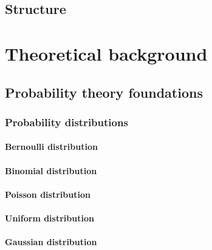 \documentclass[english,master,unicode]{ctufit-thesis}
\theoremstyle{plain}
\theoremstyle{definition}
\theoremstyle{remark}
\numberwithin{theorem}{chapter}
\begin{document}
    \section*{Structure}\label{sec:structure}
        

\chapter{Theoretical background}\label{ch:theory}
    
    \section{Probability theory foundations}\label{sec:prob-foundations}
        
        \subsection{Probability distributions}\label{sec:prob-distributions}
            
            \subsubsection{Bernoulli distribution}\label{sec:bernoulli-distribution}
                
            \subsubsection{Binomial distribution}\label{sec:binomial-distribution}
                
            \subsubsection{Poisson distribution}\label{sec:poisson-distribution}
                
            \subsubsection{Uniform distribution}\label{sec:uniform-distribution}
                
            \subsubsection{Gaussian distribution}\label{sec:gaussian-distribution}
                
\end{document}
